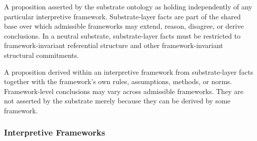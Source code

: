\begin{description}[style=nextline,leftmargin=1.5cm]
\item[Substrate-Layer Fact]
A proposition asserted by the substrate ontology
as holding independently of any particular interpretive framework.
Substrate-layer facts are part of the shared base
over which admissible frameworks may extend,
reason, disagree, or derive conclusions.
In a neutral substrate,
substrate-layer facts must be restricted to
framework-invariant referential structure
and other framework-invariant structural commitments.

\item[Framework-Level Conclusion]
A proposition derived within an interpretive framework
from substrate-layer facts together with
the framework's own rules, assumptions, methods, or norms.
Framework-level conclusions may vary across admissible frameworks.
They are not asserted by the substrate merely because
they can be derived by some framework.

\end{description}

\subsubsection*{Interpretive Frameworks}


